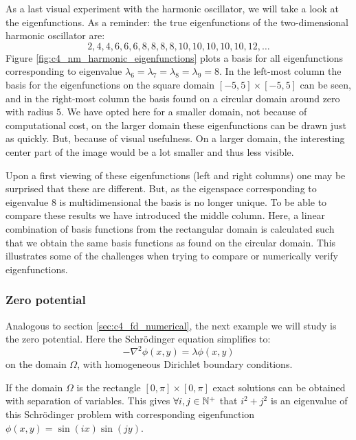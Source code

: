 As a last visual experiment with the harmonic oscillator, we will take a look at the eigenfunctions. As a reminder: the true eigenfunctions of the two-dimensional harmonic oscillator are:
$$
    2, 4, 4, 6, 6, 6, 8, 8, 8, 8, 10, 10, 10, 10, 10, 12, \dots
$$
Figure \ref{fig:c4_nm_harmonic_eigenfunctions} plots a basis for all eigenfunctions corresponding to eigenvalue $\lambda_6 = \lambda_7 = \lambda_8 = \lambda_9 = 8$. In the left-most column the basis for the eigenfunctions on the square domain $[-5, 5] \times [-5, 5]$ can be seen, and in the right-most column the basis found on a circular domain around zero with radius $5$. We have opted here for a smaller domain, not because of computational cost, on the larger domain these eigenfunctions can be drawn just as quickly. But, because of visual usefulness. On a larger domain, the interesting center part of the image would be a lot smaller and thus less visible.

Upon a first viewing of these eigenfunctions (left and right columns) one may be surprised that these are different. But, as the eigenspace corresponding to eigenvalue $8$ is multidimensional the basis is no longer unique. To be able to compare these results we have introduced the middle column. Here, a linear combination of basis functions from the rectangular domain is calculated such that we obtain the same basis functions as found on the circular domain. This illustrates some of the challenges when trying to compare or numerically verify eigenfunctions.

\subsubsection{Zero potential}\label{sec:c4_numerical_zero}

Analogous to section \ref{sec:c4_fd_numerical}, the next example we will study is the zero potential. Here the Schrödinger equation simplifies to:
$$
    -\nabla^2 \phi(x, y) = \lambda\phi(x, y)
$$
on the domain $\Omega$, with homogeneous Dirichlet boundary conditions.

If the domain $\Omega$ is the rectangle $[0, \pi] \times [0, \pi]$ exact solutions can be obtained with separation of variables. This gives $\forall i, j \in \mathbb{N}^{+}$ that $i^2 + j^2$ is an eigenvalue of this Schrödinger problem with corresponding eigenfunction $\phi(x, y) = \sin(i x)\sin(j y)$.

